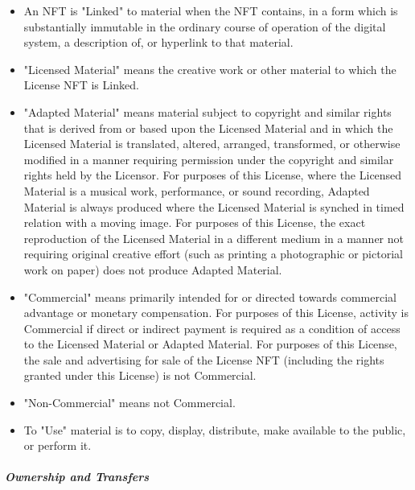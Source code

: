 \documentclass{article}
\begin{document}
	\begin{itemize}
	
	\item	An NFT is "Linked" to material when the NFT contains, in a form which is substantially immutable in the ordinary course of operation of the digital system, a description of, or hyperlink to that material.

	\item	"Licensed Material" means the creative work or other material to which the License NFT is Linked.

	\item "Adapted Material" means material subject to copyright and similar rights that is derived from or based upon the Licensed Material and in which the Licensed Material is translated, altered, arranged, transformed, or otherwise modified in a manner requiring permission under the copyright and similar rights held by the Licensor. For purposes of this License, where the Licensed Material is a musical work, performance, or sound recording, Adapted Material is always produced where the Licensed Material is synched in timed relation with a moving image. For purposes of this License, the exact reproduction of the Licensed Material in a different medium in a manner not requiring original creative effort (such as printing a photographic or pictorial work on paper) does not produce Adapted Material.

	\item	"Commercial" means primarily intended for or directed towards commercial advantage or monetary compensation. For purposes of this License, activity is Commercial if direct or indirect payment is required as a condition of access to the Licensed Material or Adapted Material. For purposes of this License, the sale and advertising for sale of the License NFT (including the rights granted under this License) is not Commercial.

	\item	"Non-Commercial" means not Commercial.

	\item	To "Use" material is to copy, display, distribute, make available to the public, or perform it.

	\end{itemize}

	\subparagraph{Ownership and Transfers}
\end{document}
